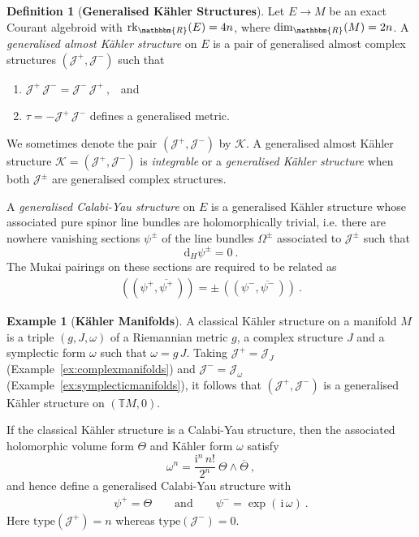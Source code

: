 \documentclass[a4paper, reqno, 11pt]{amsart}
\numberwithin{equation}{section}
\theoremstyle{definition}
\newtheorem{definition}[equation]{Definition}
\newtheorem{example}[equation]{Example}
\newcommand{\de}{\mathrm{d}}
\newcommand{\ii}{\mathrm{i}}
\newcommand{\IR}{\mathbbm{R}}
\newcommand{\IT}{\mathbb{T}}
\newcommand{\cK}{{\mathcal K}}
\newcommand{\cJ}{{\mathcal J}}
\newcommand{\rk}{\mathrm{rk}}
\theoremstyle{remark}
\begin{document}
\begin{definition}[\textbf{Generalised K\"ahler Structures}]\label{def:GKstructure}
    Let $E\to M$ be an exact Courant algebroid with $\rk_\IR(E)=4n$, where $\dim_\IR(M)=2n$. A \emph{generalised almost K\"ahler structure} on $E$ is a pair of generalised almost complex structures $(\cJ^+, \cJ^-)$ such that
    \begin{enumerate}
        \item $\cJ^+\, \cJ^- = \cJ^-\, \cJ^+ \ , $ \ and \\[-3mm]
        \item $\tau = - \cJ^+\, \cJ^-$ defines a generalised metric.
    \end{enumerate} 
    We sometimes denote the pair $(\cJ^+,\cJ^-)$ by $\cK$. A generalised almost K\"ahler structure $\cK = (\cJ^+,\cJ^-)$ is \emph{integrable} or a \emph{generalised K\"ahler structure} when both $\cJ^\pm$ are generalised complex structures.

    A \emph{generalised Calabi-Yau structure} on $E$ is a generalised K\"ahler structure whose associated pure spinor line bundles are holomorphically trivial, i.e. there are nowhere vanishing sections $\psi^\pm$ of the line bundles $\Omega^\pm$  associated to $\cJ^\pm$ such that $$\de_H \psi^\pm = 0 \ . $$
    The Mukai pairings on these sections are required to be related as
    \begin{align}
        (\!(\psi^+,\overline{\psi^+}\,)\!) = \pm\,(\!(\psi^-,\overline{\psi^-}\,)\!) \ .
    \end{align}
\end{definition}

\begin{example}[\textbf{K\"ahler Manifolds}]
    A classical K\"ahler structure on a manifold $M$ is a triple $(g,J,\omega)$ of a Riemannian metric $g$, a complex structure $J$ and a symplectic form $\omega$ such that $\omega=g\,J$. Taking $\cJ^+ = \cJ_J$ (Example~\ref{ex:complexmanifolds}) and $\cJ^- = \cJ_\omega$ (Example~\ref{ex:symplecticmanifolds}), it follows that $(\cJ^+,\cJ^-)$ is a generalised K\"ahler structure on $(\IT M,0)$. 
    
    If the classical K\"ahler structure is a Calabi-Yau structure, then the associated holomorphic volume form $\Theta$ and K\"ahler form $\omega$ satisfy $$\omega^n = \frac{\ii^n\, n!}{2^n} \ \Theta \wedge \overline \Theta \ , $$ and hence define a generalised Calabi-Yau structure with 
    \begin{align}
        \psi^+ = \Theta \qquad \text{and} \qquad \psi^- = \exp(\,\ii\,\omega) \ .
    \end{align}
    Here $\mathrm{type}(\cJ^+)=n$ whereas $\mathrm{type}(\cJ^-)=0$.
\end{example}
\end{document}
